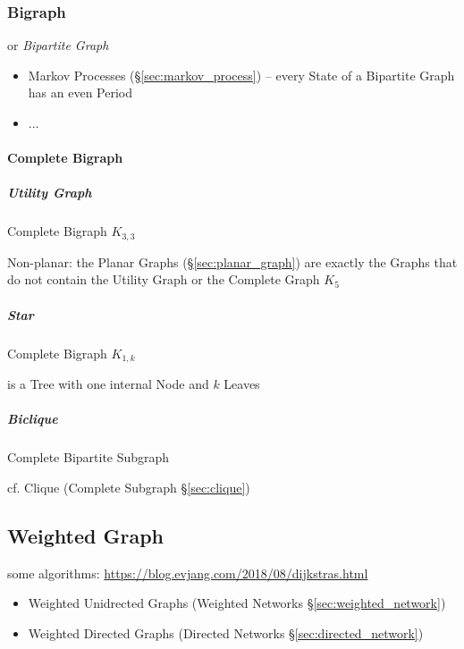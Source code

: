\subsubsection{Bigraph}\label{sec:bigraph}

or \emph{Bipartite Graph}

\begin{itemize}
  \item Markov Processes (\S\ref{sec:markov_process}) -- every State of a
    Bipartite Graph has an even Period
  \item ...
\end{itemize}



\paragraph{Complete Bigraph}\label{sec:complete_bigraph}\hfill

\subparagraph{Utility Graph}\label{sec:utility_graph}\hfill

Complete Bigraph $K_{3,3}$

Non-planar: the Planar Graphs (\S\ref{sec:planar_graph}) are exactly the Graphs
that do not contain the Utility Graph or the Complete Graph $K_5$



\subparagraph{Star}\label{sec:star}\hfill

Complete Bigraph $K_{1,k}$

is a Tree with one internal Node and $k$ Leaves



\subparagraph{Biclique}\label{sec:biclique}\hfill

Complete Bipartite Subgraph

cf. Clique (Complete Subgraph \S\ref{sec:clique})



\subsection{Weighted Graph}\label{sec:weighted_graph}

some algorithms: \url{https://blog.evjang.com/2018/08/dijkstras.html}

\begin{itemize}
  \item Weighted Unidrected Graphs (Weighted Networks
    \S\ref{sec:weighted_network})
  \item Weighted Directed Graphs (Directed Networks
    \S\ref{sec:directed_network})
\end{itemize}



